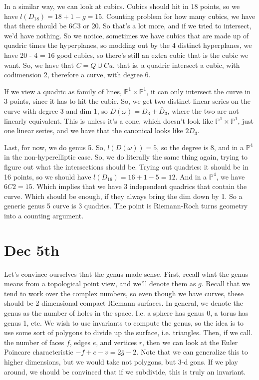 \documentclass[10pt]{article}
\begin{document}
In a similar way, we can look at cubics. Cubics should hit in 18 points, so we have $l(D_{18}) = 18 + 1 - g = 15$. Counting problem for how many cubics, we have that there should be $6C3$ or 20. So that’s a lot more, and if we tried to intersect, we’d have nothing. So we notice, sometimes we have cubics that are made up of quadric times the hyperplanes, so modding out by the 4 distinct hyperplanes, we have 20 - 4 = 16 good cubics, so there’s still an extra cubic that is the cubic we want. So, we have that $C = Q \cup Cu$, that is, a quadric intersect a cubic, with codimension 2, therefore a curve, with degree 6. 

If we view a quadric as family of lines, $\mathbb{P}^1 \times \mathbb{P}^1$, it can only intersect the curve in 3 points, since it has to hit the cubic. So, we get two distinct linear series on the curve with degree 3 and dim 1, so $D(\omega) = D_3 + \overline{D}_3$, where the two are not linearly equivalent. This is unless it’s a cone, which doesn’t look like $\mathbb{P}^1 \times \mathbb{P}^1$, just one linear series, and we have that the canonical looks like $2D_3$.

Last, for now, we do genus 5. So, $l(D(\omega)) = 5$, so the degree is 8, and in a $\mathbb{P}^4$ in the non-hyperelliptic case. So, we do literally the same thing again, trying to figure out what the intersections should be. Trying out quadrics: it should be in 16 points, so we should have $l(D_{16}) = 16 +1 - 5 = 12$. And in a $\mathbb{P}^4$,  we have $6C2 = 15$. Which implies that we have 3 independent quadrics that contain the curve. Which should be enough, if they always bring the dim down by 1. So a generic genus 5 curve is 3 quadrics. The point is Riemann-Roch turns geometry into a counting argument.

\section{Dec 5th}

Let’s convince ourselves that the genus made sense. First, recall what the genus means from a topological point view, and we’ll denote them as $\overline{g}$. Recall that we tend to work over the complex numbers, so even though we have curves, these should be 2 dimensional compact Riemann surfaces. In general, we denote the genus as the number of holes in the space. I.e. a sphere has genus 0, a torus has genus 1, etc. We wish to use invariants to compute the genus, so the idea is to use some sort of polygons to divide up the surface, i.e. triangles. Then, if we call. the number of faces $f$, edges $e$, and vertices $r$, then we can look at the Euler Poincare characteristic $-f + e - v = 2 \overline{g} - 2$. Note that we can generalize this to higher dimensions, but we would take not polygons, but 3-d gons. If we play around, we should be convinced that if we subdivide, this is truly an invariant.
\end{document}
